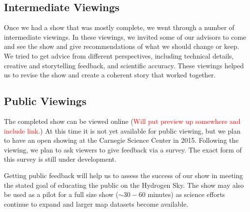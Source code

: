 \subsection{Intermediate Viewings}
Once we had a show that was mostly complete, we went through a number of intermediate viewings. In these viewings, we invited some of our advisors to come and see the show and give recommendations of what we should change or keep. We tried to get advice from different perspectives, including technical details, creative and storytelling feedback, and scientific accuracy. These viewings helped us to revise the show and create a coherent story that worked together. 

\subsection{Public Viewings}
The completed show can be viewed online (\textcolor{red}{Will put preview up somewhere and include link.}) At this time it is not yet available for public viewing, but we plan to have an open showing at the Carnegie Science Center in 2015. Following the viewing, we plan to ask viewers to give feedback via a survey. The exact form of this survey is still under development. 

Getting public feedback will help us to assess the success of our show in meeting the stated goal of educating the public on the Hydrogen Sky. The show may also be used as a pilot for a full size show ($\sim 30-60$ minutes) as \cm science efforts continue to expand and larger \cm map datasets become available. 
